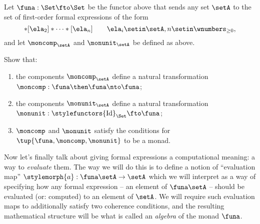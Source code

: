 \begin{gradedexercise}
    \label{ex:ListMonad}
    Let $\funa : \Set \fto \Set$ be the functor above that sends any set $\setA$ to the set of first-order formal expressions of the form
    \begin{equation}
        [\ela_1]
        * [\ela_2] * \cdots * [\ela_n] \quad \quad \ela_i \setin \setA, n \setin \wnumbers_{\geq 0},
    \end{equation}
    and let $\moncomp_\setA$ and $\monunit_\setA$ be defined as above.

    Show that:
    \begin{enumerate}
        \item the components $\moncomp_\setA$ define a natural transformation $\moncomp : \funa \then \funa \nto \funa$;
        \item the components $\monunit_\setA$ define a natural transformation $\monunit : \stylefunctors{\text{Id}}_{\Set} \fto \funa$;
        \item $\moncomp$ and $\monunit$ satisfy the conditions for $\tup{\funa, \moncomp, \monunit}$ to be a monad.
    \end{enumerate}
\end{gradedexercise}


Now let's finally talk about giving formal expressions a computational meaning: a way to \emph{evaluate} them.
The way we will do this is to define a notion of ``evaluation map'' $\stylemorph{a}: \funa \setA \to \setA$ which we will interpret as a way of specifying how any formal expression -- an element of $\funa \setA$ -- should be evaluated (or: computed) to an element of $\setA$.
We will require such evaluation maps to additionally satisfy two coherence conditions, and the resulting mathematical structure will be what is called an \emph{algebra} of the monad $\funa$.


